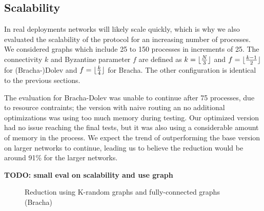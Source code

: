 \subsection{Scalability}
In real deployments networks will likely scale quickly, which is why we also evaluated the scalability of the protocol for an increasing number of processes. We considered graphs which include 25 to 150 processes in increments of 25. The connectivity $k$ and Byzantine parameter $f$ are defined as $k=\lfloor\frac{N}{3}\rfloor$ and $f=\lfloor\frac{k-1}{2}\rfloor$ for (Bracha-)Dolev and $f=\lfloor\frac{k}{4}\rfloor$ for Bracha. The other configuration is identical to the previous sections.

The evaluation for Bracha-Dolev was unable to continue after 75 processes, due to resource contraints; the version with naive routing an no additional optimizations was using too much memory during testing. Our optimized version had no issue reaching the final tests, but it was also using a considerable amount of memory in the process. We expect the trend of outperforming the base version on larger networks to continue, leading us to believe the reduction would be around 91\% for the larger networks.

\textbf{TODO: small eval on scalability and use graph}

\begin{figure}[h]
    \centering
    
    \caption{Reduction using K-random graphs and fully-connected graphs (Bracha)}
\end{figure}

